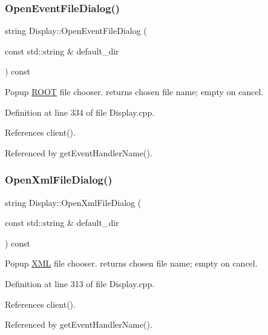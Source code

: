 \subsubsection{\texorpdfstring{Open\+Event\+File\+Dialog()}{OpenEventFileDialog()}}
{\footnotesize\ttfamily string Display\+::\+Open\+Event\+File\+Dialog (\begin{DoxyParamCaption}\item[{const std\+::string \&}]{default\+\_\+dir }\end{DoxyParamCaption}) const}



Popup \hyperlink{namespace_r_o_o_t}{R\+O\+OT} file chooser. returns chosen file name; empty on cancel. 



Definition at line 334 of file Display.\+cpp.



References client().



Referenced by get\+Event\+Handler\+Name().

\hypertarget{class_d_d4hep_1_1_display_a9dd5c9d27bcea4eceb79b2f88db03e32}{}\label{class_d_d4hep_1_1_display_a9dd5c9d27bcea4eceb79b2f88db03e32} 
\subsubsection{\texorpdfstring{Open\+Xml\+File\+Dialog()}{OpenXmlFileDialog()}}
{\footnotesize\ttfamily string Display\+::\+Open\+Xml\+File\+Dialog (\begin{DoxyParamCaption}\item[{const std\+::string \&}]{default\+\_\+dir }\end{DoxyParamCaption}) const}



Popup \hyperlink{namespace_d_d4hep_1_1_x_m_l}{X\+ML} file chooser. returns chosen file name; empty on cancel. 



Definition at line 313 of file Display.\+cpp.



References client().



Referenced by get\+Event\+Handler\+Name().

